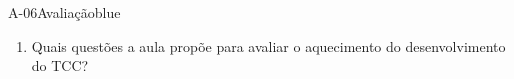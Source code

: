 \documentclass[aspectratio=169,usenames,dvipsnames,compress]{beamer}
\begin{document}
\begin{frame}[fragile]
\begin{Constative}{A-06}{Avaliação}{blue}
\begin{enumerate}[label=(\alph*),start=1]
\item Quais questões a aula propõe para avaliar o aquecimento do desenvolvimento do TCC?

\end{enumerate}
\end{Constative}
\end{frame}
\end{document}
